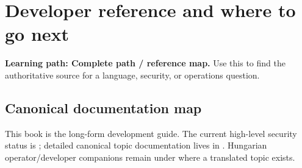 \chapter{Developer reference and where to go next}

\noindent\textbf{Learning path: Complete path / reference map.} Use this to find the authoritative source for a language, security, or operations question.\par\medskip

\section{Canonical documentation map}

This book is the long-form development guide. The current high-level security status is ; detailed canonical topic documentation lives in . Hungarian operator/developer companions remain under  where a translated topic exists.

